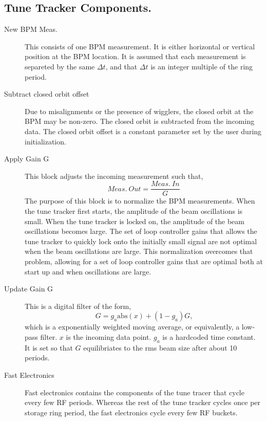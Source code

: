 \subsection{Tune Tracker Components.}
\begin{description}
\item[New BPM Meas.]  
This consists of one BPM measurement.  It is either horizontal or
vertical position at the BPM location.  It is assumed that each
measurement is separeted by the same $\Delta t$, and that $\Delta t$
is an integer multiple of the ring period.

\item[Subtract closed orbit offset]  
Due to misalignments or the presence of wigglers, the closed orbit at
the BPM may be non-zero.  The closed orbit is subtracted from the
incoming data.  The closed orbit offset is a constant parameter set by
the user during initialization.

\item[Apply Gain G]  This block adjusts the incoming measurement such that,
\begin{equation*}
Meas.\ Out = \frac{Meas.\ In}{G}
\end{equation*}
The purpose of this block is to normalize the BPM measurements.  When
the tune tracker first starts, the amplitude of the beam oscillations
is small.  When the tune tracker is locked on, the amplitude of the
beam oscillations becomes large.  The set of loop controller gains
that allows the tune tracker to quickly lock onto the initially small
signal are not optimal when the beam oscillations are large.  This
normalization overcomes that problem, allowing for a set of loop
controller gains that are optimal both at start up and when
oscillations are large.

\item[Update Gain G]  This is a digital filter of the form,
\begin{equation*}
G = g_a \textrm{abs}\left(x\right) + \left(1-g_a\right)G\textrm{,}
\end{equation*}
which is a exponentially weighted moving average, or equivalently, a
low-pass filter.  $x$ is the incoming data point.  $g_a$ is a
hardcoded time constant.  It is set so that $G$ equilibriates to the
rms beam size after about 10 periods.

\item[Fast Electronics]  
Fast electronics contains the components of the tune tracer that cycle
every few RF periods.  Whereas the rest of the tune tracker cycles
once per storage ring period, the fast electronics cycle every few RF
buckets.


\end{description}
